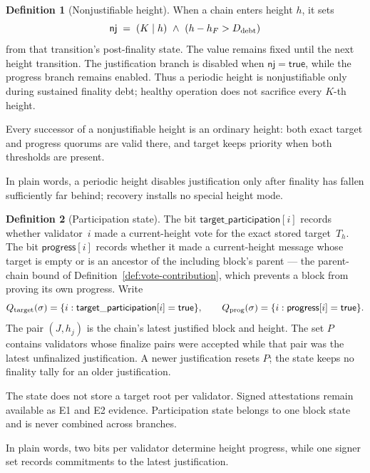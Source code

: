 \ifx\litemode\undefined\documentclass{article}\fi
\theoremstyle{plain}
\theoremstyle{definition}
\newtheorem{definition}{Definition}
\theoremstyle{remark}
\newcommand{\targetParticipation}{\mathsf{target\_participation}}
\newcommand{\progressBit}{\mathsf{progress}}
\newcommand{\nj}{\mathsf{nj}}
\begin{document}
\begin{definition}[Nonjustifiable height]\label{def:nonjustifiable}
When a chain enters height \(h\), it sets
\[
 \nj \;=\; (K\mid h)\ \wedge\ (h-h_F>D_{\rm debt})
\]
from that transition's post-finality state.  The value remains fixed until
the next height transition.  The justification branch is disabled when
\(\nj=\mathsf{true}\), while the progress branch remains enabled.  Thus a
periodic height is nonjustifiable only during sustained finality debt;
healthy operation does not sacrifice every \(K\)-th height.

Every successor of a nonjustifiable height is an ordinary height: both exact
target and progress quorums are valid there, and target keeps priority when
both thresholds are present.

In plain words, a periodic height disables justification only after finality
has fallen sufficiently far behind; recovery installs no special height mode.
\end{definition}

\begin{definition}[Participation state]\label{def:participation-state}
The bit \(\targetParticipation[i]\) records whether validator~\(i\) made a
current-height vote for the exact stored target~\(T_h\).  The bit
\(\progressBit[i]\) records whether it made a current-height message whose target
is empty or is an ancestor of the including block's parent --- the
parent-chain bound of Definition~\ref{def:vote-contribution}, which
prevents a block from proving its own progress.  Write
\[
  Q_{\rm target}(\sigma)=\{i:\targetParticipation[i]=\mathsf{true}\},
  \qquad
  Q_{\rm prog}(\sigma)=\{i:\progressBit[i]=\mathsf{true}\}.
\]
The pair \((J,h_j)\) is the chain's latest justified block and height.
The set \(P\) contains validators whose finalize pairs were accepted while
that pair was the latest unfinalized justification.  A newer justification
resets \(P\); the state keeps no finality tally for an older justification.

The state does not store a target root per validator.  Signed attestations
remain available as E1 and E2 evidence.  Participation state belongs to one
block state and is never combined across branches.

In plain words, two bits per validator determine height progress, while one
signer set records commitments to the latest justification.
\end{definition}
\end{document}
